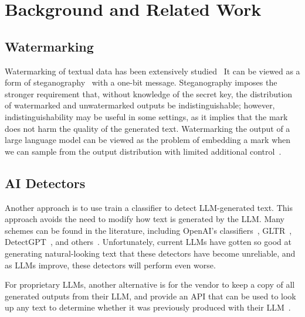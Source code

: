 \section{Background and Related Work}
\label{sec:relwork}

\subsection{Watermarking}

Watermarking of textual data has been extensively studied~\citep{kamaruddin18,rizzo17,ahvanooey19}
It can be viewed as a form of steganography~\citep{cox_information_2005,majeed_review_2021} with a one-bit message.
Steganography imposes the stronger requirement that, without knowledge of the secret key, the distribution of watermarked and unwatermarked outputs be indistinguishable; however, indistinguishability may be useful in some settings, as it implies that the mark does not harm the quality of the generated text.
Watermarking the output of a large language model can be viewed as the problem of embedding a mark when we can sample from the output distribution with limited additional control~\citep{hopper2008stego,ziegler_neural_2019a,xiang_novel_2020,kang_generative_2020,cao_generative_2022}. 

\subsection{AI Detectors}

Another approach is to use train a classifier to detect LLM-generated text.
This approach avoids the need to modify how text is generated by the LLM.
Many schemes can be found in the literature,
including OpenAI's classifiers~\citep{openai_gpt2outputdataset_2021,openai_new_2023}, GLTR~\citep{gehrmann_gltr_2019a}, DetectGPT~\citep{mitchell_detectgpt_2023},
and others~\citep{bakhtin_real_2019,zellers_defending_2019a,ippolito_automatic_2020,uchendu_authorship_2020,fagni_tweepfake_2021}.
Unfortunately, current LLMs have gotten so good at generating natural-looking text that these detectors have become unreliable, and as LLMs improve, these detectors will perform even worse.

For proprietary LLMs, another alternative is for the vendor to keep a copy of all generated outputs from their LLM, and provide an API that can be used to look up any text to determine whether it was previously produced with their LLM~\citep{krishna_paraphrasing_2023}.



